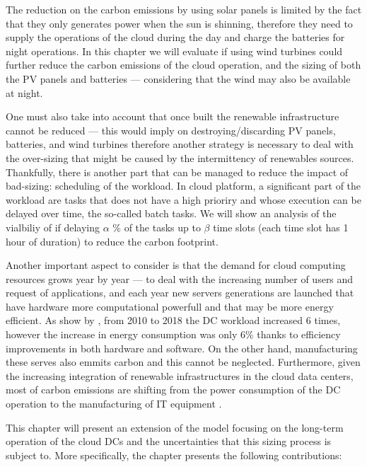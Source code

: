 The reduction on the carbon emissions by using solar panels is limited by the fact that they only generates power when the sun is shinning, therefore they need to supply the operations of the cloud during the day and charge the batteries for night operations. In this chapter we will evaluate if using wind turbines could further reduce the carbon emissions of the cloud operation, and the sizing of both the PV panels and batteries --- considering that the wind may also be available at night.

One must also take into account that once built the renewable infrastructure cannot be reduced --- this would imply on destroying/discarding PV panels, batteries, and wind turbines therefore another strategy is necessary to deal with the over-sizing that might be caused by the intermittency of renewables sources. Thankfully, there is another part that can be managed to reduce the impact of bad-sizing: scheduling of the workload. In cloud platform, a significant part of the workload are tasks that does not have a high prioriry and whose execution can be delayed over time, the so-called batch tasks. We will show an analysis of the vialbiliy of if delaying $\alpha$ \% of the tasks up  to $\beta$ time slots (each time slot has 1 hour of duration) to reduce the carbon footprint.

Another important aspect to consider is that the demand for cloud computing resources grows year by year --- to deal with the increasing number of users and request of applications, and each year new servers generations are launched that have hardware more computational powerfull and that may be more energy efficient. As show by \citet{masanet2020recalibrating}, from 2010 to 2018 the DC workload increased 6 times, however the increase in energy consumption was only 6\% thanks to efficiency improvements in both hardware and software.  On the other hand, manufacturing these serves also emmits carbon and this cannot be neglected. Furthermore, given the increasing integration of renewable infrastructures in the cloud data centers, most of carbon emissions are shifting from the power consumption of the DC operation to the manufacturing of IT equipment \cite{gupta2021_chasingcarbon}.

This chapter will present an extension of the model focusing on the long-term operation of the cloud DCs and the uncertainties that this sizing process is subject to. More specifically, the chapter presents the following contributions:

